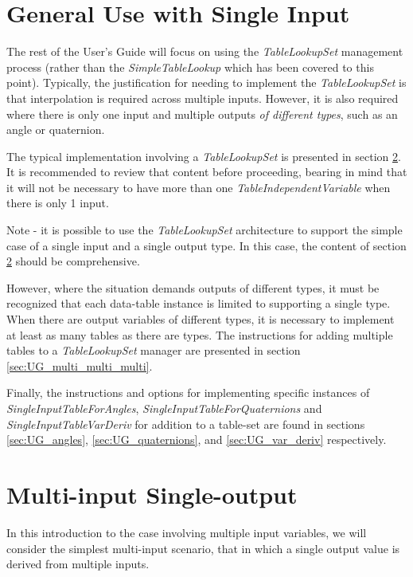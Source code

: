 \documentclass[11pt,fleqn]{report}
\begin{document}
\section{General Use with Single Input}
The rest of the User's Guide will focus on using the \textit{TableLookupSet}
management process (rather than the \textit{SimpleTableLookup} which has
been covered to this point). Typically, the justification for needing to
implement the \textit{TableLookupSet} is that interpolation is required
across multiple inputs.  However, it is also required where there is only one
input and multiple outputs \textit{of different types}, such as an angle or
quaternion.

The typical implementation involving a \textit{TableLookupSet} is presented
in section \ref{sec:UG_multi_single}.  It is recommended to review that
content before proceeding, bearing in mind that it will not be necessary to
have more than one \textit{TableIndependentVariable} when there is only 1
input.

Note - it is possible to use the \textit{TableLookupSet} architecture to
support the simple case of a single input and a single output type.  In this
case, the content of section \ref{sec:UG_multi_single} should be
comprehensive.

However, where the situation demands outputs of different types, it must be
recognized that each data-table instance is limited to supporting a single
type.
When there are output variables of different types, it is necessary to
implement at least as many tables as there are types.  The instructions
for adding
multiple tables to a \textit{TableLookupSet} manager are presented in section
\ref{sec:UG_multi_multi_multi}.

Finally, the instructions and options for implementing specific instances of
\textit{SingleInputTableForAngles},
\textit{SingleInputTableForQuaternions} and \textit{SingleInputTableVarDeriv}
for addition to a table-set are found in sections
\ref{sec:UG_angles}, \ref{sec:UG_quaternions}, and \ref{sec:UG_var_deriv}
respectively.

\section{Multi-input Single-output} \label{sec:UG_multi_single}
In this introduction to the case involving multiple input variables,
we will consider the simplest multi-input scenario, that in which a single
output value is derived from multiple inputs.
\end{document}

